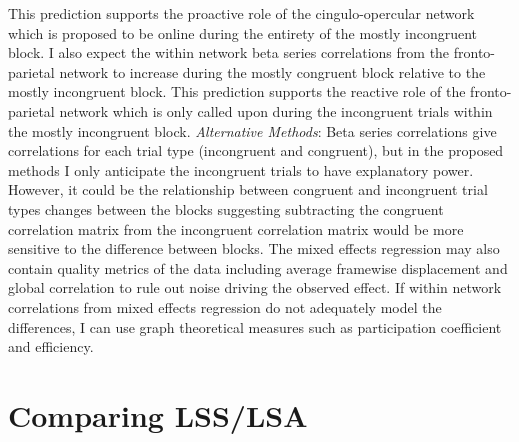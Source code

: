 \documentclass[phd,appendix,figures]{uithesis}
\begin{document}
This prediction supports the proactive role of the cingulo-opercular network which is proposed to be online during the entirety of the mostly incongruent block.
I also expect the within network beta series correlations from the fronto-parietal network to increase during the mostly congruent block relative to the mostly incongruent block.
This prediction supports the reactive role of the fronto-parietal network which is only called upon during the incongruent trials within the mostly incongruent block.
\newline
\newline
\textit{Alternative Methods}:
Beta series correlations give correlations for each trial type (incongruent and congruent), but in the proposed methods I only anticipate the incongruent trials to have explanatory power.
However, it could be the relationship between congruent and incongruent trial types changes between the blocks suggesting subtracting the congruent correlation matrix from the incongruent correlation matrix would be more sensitive to the difference between blocks.
The mixed effects regression may also contain quality metrics of the data including average framewise displacement and global correlation to rule out noise driving the observed effect. 
If within network correlations from mixed effects regression do not adequately model the differences, I can use graph theoretical measures such as participation coefficient and efficiency.
\newline

\chapter{Comparing LSS/LSA}
\end{document}
